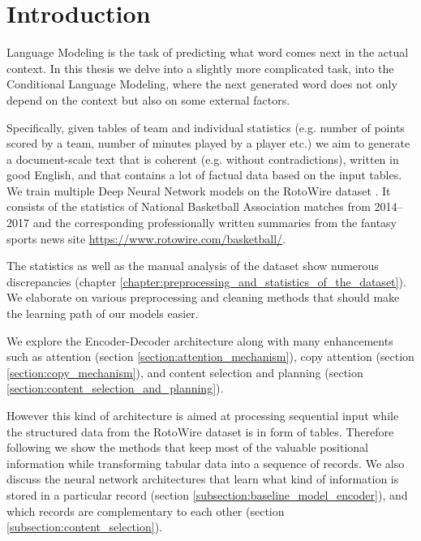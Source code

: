 \chapter*{Introduction} \label{chapter:introduction}

Language Modeling is the task of predicting what word comes next in the actual context. In this thesis we delve into a slightly more complicated task, into the Conditional Language Modeling, where the next generated word does not only depend on the context but also on some external factors.

Specifically, given tables of team and individual statistics (e.g. number of points scored by a team,  number of minutes played by a player etc.) we aim to generate a document-scale text that is coherent (e.g. without contradictions), written in good English, and that contains a lot of factual data based on the input tables. We train multiple Deep Neural Network models on the RotoWire dataset \citep{wiseman2017}. It consists of the statistics of National Basketball Association matches from 2014--2017 and the corresponding professionally written summaries from the fantasy sports news site \url{https://www.rotowire.com/basketball/}.

The statistics as well as the manual analysis of the dataset show numerous discrepancies (chapter \ref{chapter:preprocessing_and_statistics_of_the_dataset}). We elaborate on various preprocessing and cleaning methods that should make the learning path of our models easier.

We explore the Encoder-Decoder architecture \citep{sutskever2014sequence} along with many enhancements such as attention (section \ref{section:attention_mechanism}), copy attention (section \ref{section:copy_mechanism}), and content selection and planning (section \ref{section:content_selection_and_planning}).

However this kind of architecture is aimed at processing sequential input while the structured data from the RotoWire dataset is in form of tables. Therefore following \citet{wiseman2017} we show the methods that keep most of the valuable positional information while transforming tabular data into a sequence of records. We also discuss the neural network architectures that learn what kind of information is stored in a particular record (section \ref{subsection:baseline_model_encoder}), and which records are complementary to each other (section \ref{subsection:content_selection}).


